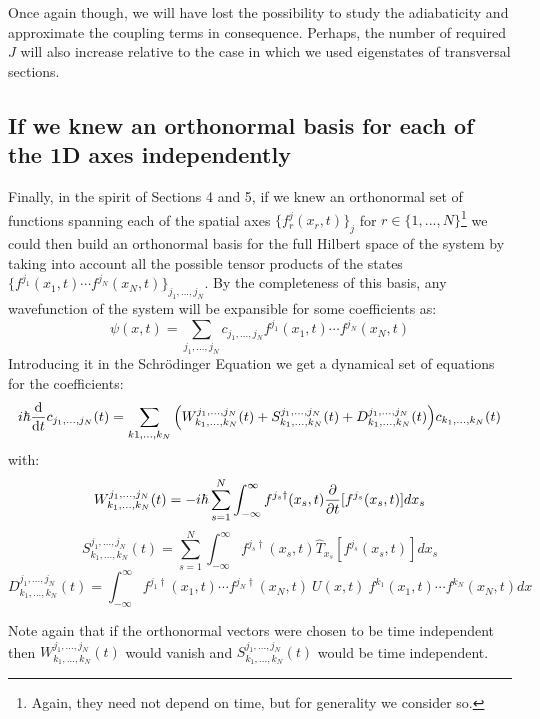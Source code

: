 \documentclass[11pt, a4paper]{article} %
\begin{document}
Once again though, we will have lost the possibility to study the adiabaticity and approximate the coupling terms in consequence. Perhaps, the number of required $J$ will also increase relative to the case in which we used eigenstates of transversal sections.

\subsection{If we knew an orthonormal basis for each of the 1D axes independently}
Finally, in the spirit of Sections 4 and 5, if we knew an orthonormal set of functions spanning each of the spatial axes $\{ f^j_r(x_r,t) \}_j$ for $r\in\{1,...,N \}$\footnote{Again, they need not depend on time, but for generality we consider so.} we could then build an orthonormal basis for the full Hilbert space of the system by taking into account all the possible tensor products of the states $\{f^{j_1}(x_1,t)\cdots f^{j_N}(x_N,t) \}_{j_1,...,j_N}$. By the completeness of this basis, any wavefunction of the system will be expansible for some coefficients as:
\begin{equation}
\psi(x,t)=\sum_{j_1,...,j_N} c_{j_1,...,j_N} f^{j_1}(x_1,t)\cdots f^{j_N}(x_N,t)
\end{equation}
Introducing it in the Schrödinger Equation we get a dynamical set of equations for the coefficients:
\begin{equation}
i\hbar \dv{}{t} c_{j_1,...,j_N}(t) = \sum_{k1,...,k_N} \qty(W^{j_1,...,j_N}_{k_1,...,k_N}(t)+S^{j_1,...,j_N}_{k_1,...,k_N}(t)+D^{j_1,...,j_N}_{k_1,...,k_N}(t))c_{k_1,...,k_N}(t)
\end{equation}
with:
\begin{equation}
W^{j_1,...,j_N}_{k_1,...,k_N}(t)=-i\hbar \sum_{s=1}^N \int_{-\infty}^{\infty}f^{j_s\dagger}(x_s,t)\pdv{}{t}[f^{j_s}(x_s,t)]dx_s
\end{equation}
\begin{equation}
S^{j_1,...,j_N}_{k_1,...,k_N}(t)=\sum_{s=1}^N \int_{-\infty}^{\infty}f^{j_s\dagger}(x_s,t)\hat{T}_{x_s}[f^{j_s}(x_s,t)]dx_s
\end{equation}
\begin{equation}
D^{j_1,...,j_N}_{k_1,...,k_N}(t)=\int_{-\infty}^{\infty}f^{j_1\dagger}(x_1,t)\cdots f^{j_N\dagger}(x_N,t)\ U(x,t)\ f^{k_1}(x_1,t)\cdots f^{k_N}(x_N,t) dx
\end{equation}

Note again that if the orthonormal vectors were chosen to be time independent then $W^{j_1,...,j_N}_{k_1,...,k_N}(t)$ would vanish and $S^{j_1,...,j_N}_{k_1,...,k_N}(t)$ would be time independent. 
\end{document}
